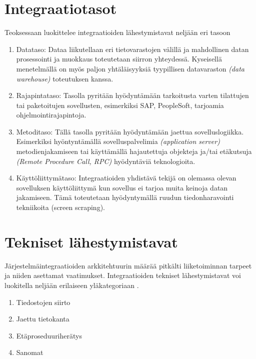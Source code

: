 \section{Integraatiotasot}

Teoksessaan \citep{linthicum2000enterprise} luokittelee integraatioiden lähestymistavat neljään eri tasoon

\begin{enumerate}
   \item Datataso: Dataa liikutellaan eri tietovarastojen välillä ja mahdollinen datan prosessointi ja muokkaus toteutetaan siirron yhteydessä. Kyseisellä menetelmällä on myös paljon yhtäläisyyksiä tyypillisen datavaraston \textit{(data warehouse)} toteutuksen kanssa.
   \item Rajapintataso: Tasolla pyritään hyödyntämään tarkoitusta varten tilattujen tai paketoitujen sovellusten, esimerkiksi SAP, PeopleSoft, tarjoamia ohjelmointirajapintoja.
   \item Metoditaso: Tällä tasolla pyritään hyödyntämään jaettua sovelluslogiikka. Esimerkiksi hyöntyntämällä sovelluspalvelimia \textit{(application server)} metodienjakamiseen tai käyttämällä hajautettuja objekteja ja/tai etäkutsuja \textit{(Remote Procedure Call, RPC)} hyödyntäviä teknologioita.
   \item Käyttöliittymätaso: Integraatioiden yhdistävä tekijä on olemassa olevan sovelluksen käyttöliittymä kun sovellus ei tarjoa muita keinoja datan jakamiseen. Tämä toteutetaan hyödyntymällä ruudun tiedonharavointi tekniikoita (screen scraping).
   
\end{enumerate}

\section{Tekniset lähestymistavat} \label{Tekniset lähestymistavat}

Järjestelmäintegraatioiden arkkitehtuurin määrää pitkälti liiketoiminnan tarpeet ja niiden asettamat vaatimukset. Integraatioiden tekniset lähestymistavat voi luokitella neljään erilaiseen yläkategoriaan \citep[sivu~64]{Hohpe2004}.

\begin{enumerate}
   \item Tiedostojen siirto
   \item Jaettu tietokanta
   \item Etäproseduuriherätys
   \item Sanomat
   
\end{enumerate}

